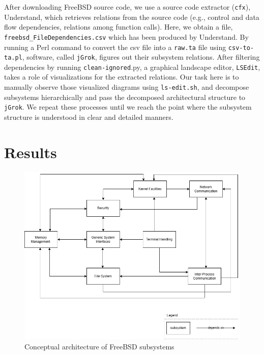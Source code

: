 \documentclass[12pt, dvipsnames, a4paper]{article}
\newcommand{\code}[1]{\texttt{#1}}
\begin{document}
After downloading FreeBSD source code, we use a source code extractor (\code{cfx}), Understand, which retrieves relations from the source code (e.g., control and data flow dependencies, relations among function calls). Here, we obtain a file, \code{freebsd\_FileDependencies.csv} which has been produced by Understand. By running a Perl command to convert the csv file into a \code{raw.ta} file using \code{csv-to-ta.pl}, software, called \code{jGrok}, figures out their subsystem relations. After filtering dependencies by running \code{clean-ignored}.py, a graphical landscape editor, \code{LSEdit}, takes a role of visualizations for the extracted relations. Our task here is to manually observe those visualized diagrams using \code{ls-edit.sh}, and decompose subsystems hierarchically and pass the decomposed architectural structure to \code{jGrok}. We repeat these processes until we reach the point where the subsystem structure is understood in clear and detailed manners.
\clearpage
\section{Results}
\lipsum[1]

\begin{figure}[!htb]
	\center
	\includegraphics[width = 390pt]{assets/conceptual-architecture.png}
	\caption{Conceptual architecture of FreeBSD subsystems}
\end{figure}
\end{document}
